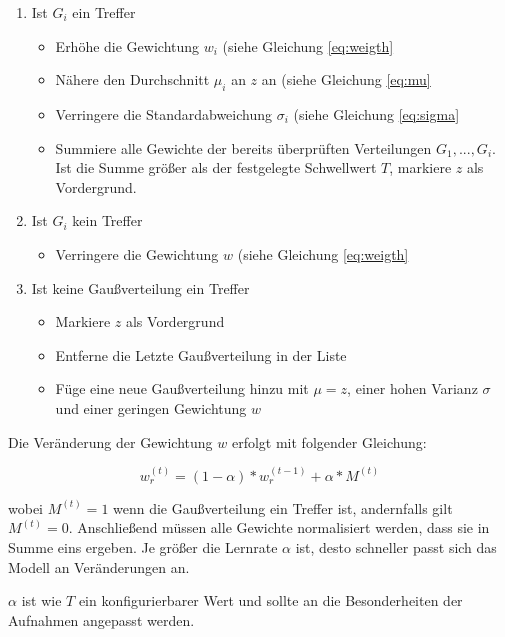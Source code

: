 \begin{enumerate}

\item Ist $G_i$ ein Treffer
	\begin{itemize}
	\item Erhöhe die Gewichtung $w_i$ (siehe Gleichung \ref{eq:weigth}
	\item Nähere den Durchschnitt $\mu_i$ an $z$ an (siehe Gleichung \ref{eq:mu}
	\item Verringere die Standardabweichung $\sigma_i$ (siehe Gleichung \ref{eq:sigma}
	\item Summiere alle Gewichte der bereits überprüften Verteilungen $G_1, ..., G_i$. Ist die Summe größer als der festgelegte Schwellwert $T$, markiere $z$ als Vordergrund.
	\end{itemize}
\item Ist $G_i$ kein Treffer
	\begin{itemize}
	\item Verringere die Gewichtung $w$ (siehe Gleichung \ref{eq:weigth}
	\end{itemize}
\item Ist keine Gaußverteilung ein Treffer
	\begin{itemize}
	\item Markiere $z$ als Vordergrund
	\item Entferne die Letzte Gaußverteilung in der Liste
	\item Füge eine neue Gaußverteilung hinzu mit $\mu = z$, einer hohen Varianz $\sigma$ und einer geringen Gewichtung $w$
	\end{itemize}

\end{enumerate} 

Die Veränderung der Gewichtung $w$ erfolgt mit folgender Gleichung:

\begin{equation}
\label{eq:weigth}
w_r^{(t)} = (1-\alpha) * w_r^{(t-1)} + \alpha * M^{(t)}
\end{equation}

wobei $M^{(t)} = 1$ wenn die Gaußverteilung ein Treffer ist, andernfalls gilt $M^{(t)} = 0$. Anschließend müssen alle Gewichte normalisiert werden, dass sie in Summe eins ergeben. Je größer die Lernrate $\alpha$ ist, desto schneller passt sich das Modell an Veränderungen an.  

$\alpha$ ist wie $T$ ein konfigurierbarer Wert und sollte an die Besonderheiten der Aufnahmen angepasst werden.  

